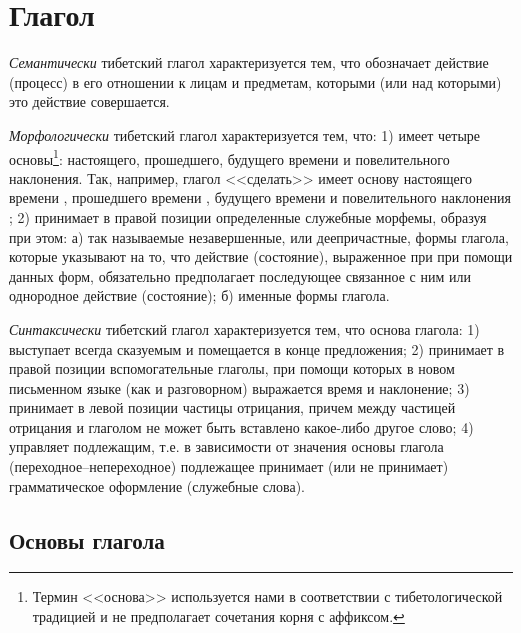 \section{Глагол}

\emph{Семантически} тибетский глагол характеризуется тем, что обозначает действие (процесс) в его отношении к лицам и предметам, которыми (или над которыми) это действие совершается.

\emph{Морфологически} тибетский глагол характеризуется тем, что: 1) имеет четыре основы\footnote[32]{Термин <<основа>> используется нами в соответствии с тибетологической традицией и не предполагает сочетания корня с аффиксом.}: настоящего, прошедшего, будущего времени и повелительного наклонения. Так, например, глагол <<сделать>> имеет основу настоящего времени , прошедшего времени , будущего времени  и повелительного наклонения ; 2) принимает в правой позиции определенные служебные морфемы, образуя при этом: а) так называемые незавершенные, или деепричастные, формы глагола, которые указывают на то, что действие (состояние), выраженное при при помощи данных форм, обязательно предполагает последующее связанное с ним или однородное действие (состояние); б) именные формы глагола.

\emph{Синтаксически} тибетский глагол характеризуется тем, что основа глагола: 1) выступает всегда сказуемым и помещается в конце предложения; 2) принимает в правой позиции вспомогательные глаголы, при помощи которых в новом письменном языке (как и разговорном) выражается время и наклонение; 3) принимает в левой позиции частицы отрицания, причем между частицей отрицания и глаголом не может быть вставлено какое-либо другое слово; 4) управляет подлежащим, т.е. в зависимости от значения основы глагола (переходное--непереходное) подлежащее принимает (или не принимает) грамматическое оформление (служебные слова).

\subsection{Основы глагола}

